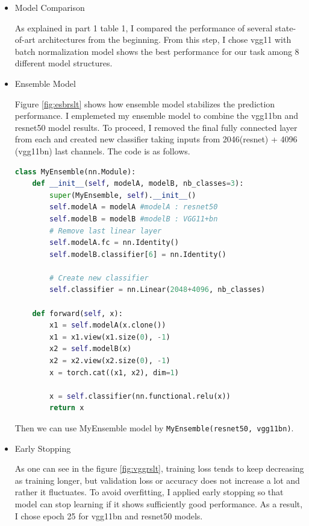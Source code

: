 \documentclass[11pt]{article}
\newcommand{\0}{{\mathbf{0}}}
\newcommand{\1}{{\mathbf{1}}}
\begin{document}
\begin{itemize}
\item Model Comparison

As explained in part 1 table 1, I compared the performance of several state-of-art architectures from the beginning. From this step, I chose vgg11 with batch normalization model shows the best performance for our task among 8 different model structures.

\item Ensemble Model

Figure \ref{fig:esbrslt} shows how ensemble model stabilizes the prediction performance. I emplemeted my ensemble model to combine the vgg11bn and resnet50 model results. To proceed, I removed the final fully connected layer from each and created new classifier taking inputs from 2046(resnet) + 4096 (vgg11bn) last channels. The code is as follows.

\begin{lstlisting}[language=Python]
class MyEnsemble(nn.Module):
    def __init__(self, modelA, modelB, nb_classes=3):
        super(MyEnsemble, self).__init__()
        self.modelA = modelA #modelA : resnet50
        self.modelB = modelB #modelB : VGG11+bn
        # Remove last linear layer
        self.modelA.fc = nn.Identity()
        self.modelB.classifier[6] = nn.Identity()
        
        # Create new classifier
        self.classifier = nn.Linear(2048+4096, nb_classes)
        
    def forward(self, x):
        x1 = self.modelA(x.clone()) 
        x1 = x1.view(x1.size(0), -1)
        x2 = self.modelB(x)
        x2 = x2.view(x2.size(0), -1)
        x = torch.cat((x1, x2), dim=1)
        
        x = self.classifier(nn.functional.relu(x))
        return x
\end{lstlisting}

Then we can use MyEnsemble model by \texttt{MyEnsemble(resnet50, vgg11bn)}. 

\item Early Stopping

As one can see in the figure \ref{fig:vggrslt}, training loss tends to keep decreasing as training longer, but validation loss or accuracy does not increase a lot and rather it fluctuates.
To avoid overfitting, I applied early stopping so that model can stop learning if it shows sufficiently good performance. As a result, I chose epoch 25 for vgg11bn and resnet50 models. 


\end{itemize}
\end{document}
